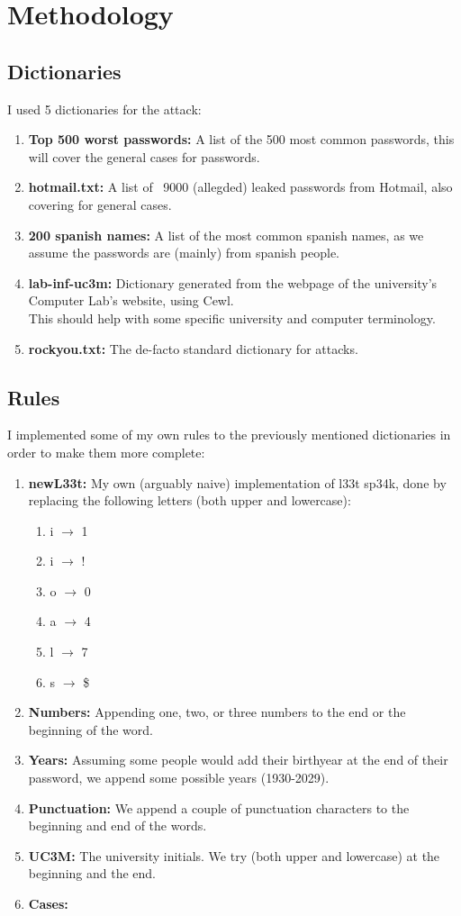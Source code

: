 \section{Methodology}

\subsection{Dictionaries}
I used 5 dictionaries for the attack:
\begin{enumerate}
    \item \textbf{Top 500 worst passwords:} A list of the 500 most common passwords, this will cover the general cases for passwords.
    \item \textbf{hotmail.txt:} A list of ~9000 (allegded) leaked passwords from Hotmail, also covering for general cases.
    \item \textbf{200 spanish names:} A list of the most common spanish names, as we assume the passwords are (mainly) from spanish people.
    \item \textbf{lab-inf-uc3m:} Dictionary generated from the webpage of the university's Computer Lab's website, using Cewl.\\
    This should help with some specific university and computer terminology.
    \item \textbf{rockyou.txt:} The de-facto standard dictionary for attacks.
\end{enumerate}

\subsection{Rules}
I implemented some of my own rules to the previously mentioned dictionaries in order to make them more complete:
\begin{enumerate}
    \item \textbf{newL33t:} My own (arguably naive) implementation of l33t sp34k, done by replacing the following letters (both upper and lowercase):
    \begin{enumerate}
        \item i $\rightarrow$ 1
        \item i $\rightarrow$ !
        \item o $\rightarrow$ 0
        \item a $\rightarrow$ 4
        \item l $\rightarrow$ 7
        \item s $\rightarrow$ \$
    \end{enumerate}
    \item \textbf{Numbers:} Appending one, two, or three numbers to the end or the beginning of the word.
    \item \textbf{Years:} Assuming some people would add their birthyear at the end of their password, we append some possible years (1930-2029).
    \item \textbf{Punctuation:} We append a couple of punctuation characters to the beginning and end of the words.
    \item \textbf{UC3M:} The university initials. We try (both upper and lowercase) at the beginning and the end.
    \item \textbf{Cases:}
\end{enumerate}
